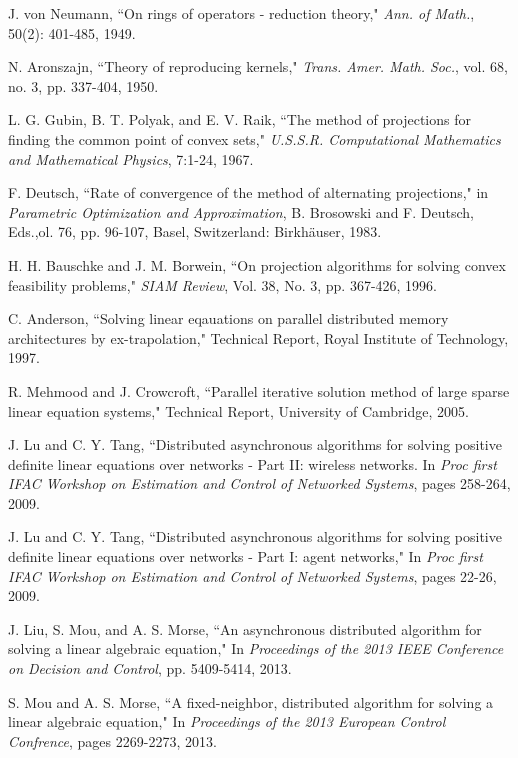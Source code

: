 \documentclass[a4paper, 11pt]{article}
\begin{document}
\begin{thebibliography}{99}
  J. von Neumann, ``On rings of operators - reduction theory," {\em  Ann. of Math.}, 50(2): 401-485, 1949.

 N. Aronszajn, ``Theory of reproducing kernels," {\em Trans. Amer. Math. Soc.},
vol. 68, no. 3, pp. 337-404, 1950.


 L. G. Gubin, B. T. Polyak, and E. V. Raik, ``The method of projections for finding the common point of convex sets," {\em U.S.S.R. Computational Mathematics and Mathematical Physics}, 7:1-24, 1967.

  F. Deutsch, ``Rate of convergence of the method of alternating projections,"
in {\em Parametric Optimization and Approximation}, B. Brosowski
and F. Deutsch, Eds.,ol. 76, pp. 96-107, Basel, Switzerland:
Birkh\"{a}user, 1983.

   H. H. Bauschke and J. M. Borwein,  ``On projection algorithms for solving convex
feasibility problems," {\em SIAM Review}, Vol. 38, No. 3, pp. 367-426,  1996.

  C. Anderson, ``Solving linear eqauations on parallel distributed memory architectures by ex-trapolation," Technical Report, Royal Institute of Technology, 1997.

 R. Mehmood and J. Crowcroft, ``Parallel iterative solution method of large sparse linear
equation systems," Technical Report, University of Cambridge, 2005.

 J. Lu and C. Y. Tang, ``Distributed asynchronous algorithms for solving
positive definite linear equations over networks - Part II: wireless
networks. In {\em Proc first IFAC Workshop on Estimation and Control of
Networked Systems}, pages 258-264, 2009.

 J. Lu and C. Y. Tang, ``Distributed asynchronous algorithms for solving
positive definite linear equations over networks - Part I: agent networks,"
In {\em Proc first IFAC Workshop on Estimation and Control of Networked
Systems}, pages 22-26, 2009.

 J. Liu, S. Mou, and A. S. Morse, ``An asynchronous distributed algorithm
for solving a linear algebraic equation,"  In {\em Proceedings of the 2013 IEEE
Conference on Decision and Control}, pp. 5409-5414, 2013.

 S. Mou and A. S. Morse, ``A fixed-neighbor, distributed algorithm for
solving a linear algebraic equation,"  In {\em Proceedings of the 2013 European
Control Confrence}, pages 2269-2273, 2013.



\end{thebibliography}
\end{document}

